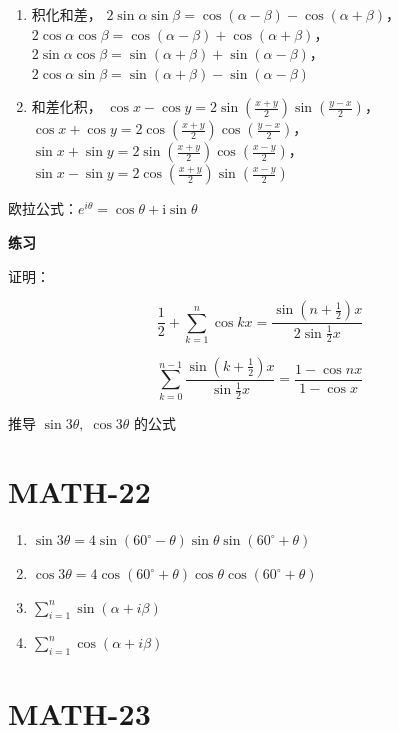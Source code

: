 \begin{enumerate}
  万能公式，令 \(t=\tan \frac{\alpha}{2}\)，
  \(\sin \alpha=\frac{2t}{1+t^{2}}\)，
  \(\cos \alpha=\frac{1-t^{2}}{1+t^{2}}\)，
  \(\tan \alpha=\frac{2t}{1-t^{2}}\)
\item
  积化和差，
  \(2\sin \alpha \sin \beta=\cos(\alpha-\beta)-\cos(\alpha+\beta)\)，
  \(2\cos \alpha \cos \beta=\cos(\alpha-\beta)+\cos(\alpha+\beta)\)，
  \(2\sin \alpha \cos \beta=\sin(\alpha+\beta)+\sin(\alpha-\beta)\)，
  \(2\cos \alpha \sin \beta=\sin(\alpha+\beta)-\sin (\alpha-\beta)\)
\item
  和差化积，
  \(\cos x- \cos y = 2 \sin \left(  \frac{x+y}{2} \right)\sin\left( \frac{y-x}{2} \right)\)，
  \(\cos x+\cos y=2\cos\left( \frac{x+y}{2} \right)\cos\left( \frac{y-x}{2} \right)\)，
  \(\sin x+\sin y=2\sin\left( \frac{x+y}{2} \right)\cos\left( \frac{x-y}{2} \right)\)，
  \(\sin x-\sin y=2\cos\left( \frac{x+y}{2} \right)\sin\left( \frac{x-y}{2} \right)\)
\end{enumerate}

欧拉公式：\(e^{i\theta}=\cos \theta+\mathrm{i}\sin \theta\)

\textbf{练习}

证明：

\[
\frac{1}{2}+\sum_{k=1}^{n}\cos kx= \frac{\sin\left( n+\frac{1}{2} \right)x}{2\sin \frac{1}{2}x}
\]

\[
\sum_{k=0}^{n-1} \frac{ \sin\left( k+\frac{1}{2} \right)x }{\sin \frac{1}{2} x} = \frac{1-\cos nx}{1-\cos x}
\]

推导 \(\sin 3 \theta, \; \cos 3 \theta\) 的公式

\section{MATH-22}\label{math-22}

\begin{enumerate}
\def\labelenumi{\arabic{enumi}.}
\tightlist
\item
  \(\sin 3\theta=4\sin(60 ^ \circ -\theta)\sin \theta \sin (60^\circ+\theta)\)
\item
  \(\cos 3\theta=4\cos(60^{\circ}+\theta)\cos \theta \cos(60^{\circ}+\theta)\)
\item
  \(\sum_{i=1}^{n}\sin(\alpha+i\beta)\)
\item
  \(\sum_{i=1}^{n}\cos(\alpha+i\beta)\)
\end{enumerate}

\section{MATH-23}\label{math-23}

